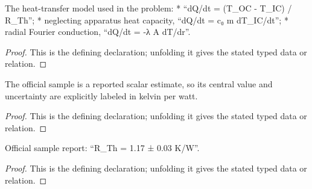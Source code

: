 \begin{definition}[GoverningLaws]
  \label{decl:physics:IPhO_2026_4_C_6:GoverningLaws}
  The heat-transfer model used in the problem: * “dQ/dt = (T\_OC - T\_IC) / R\_Th”; * neglecting apparatus heat capacity, “dQ/dt = c₀ m dT\_IC/dt”; * radial Fourier conduction, “dQ/dt = -λ A dT/dr”.
\end{definition}
\begin{proof}
  This is the defining declaration; unfolding it gives the stated typed data or relation.
\end{proof}

\begin{definition}[ThermalResistanceEstimate]
  \label{decl:physics:IPhO_2026_4_C_6:ThermalResistanceEstimate}
  The official sample is a reported scalar estimate, so its central value and uncertainty are explicitly labeled in kelvin per watt.
\end{definition}
\begin{proof}
  This is the defining declaration; unfolding it gives the stated typed data or relation.
\end{proof}

\begin{definition}[officialSampleResistance]
  \label{decl:physics:IPhO_2026_4_C_6:officialSampleResistance}
  Official sample report: “R\_Th = 1.17 ± 0.03 K/W”.
\end{definition}
\begin{proof}
  This is the defining declaration; unfolding it gives the stated typed data or relation.
\end{proof}

